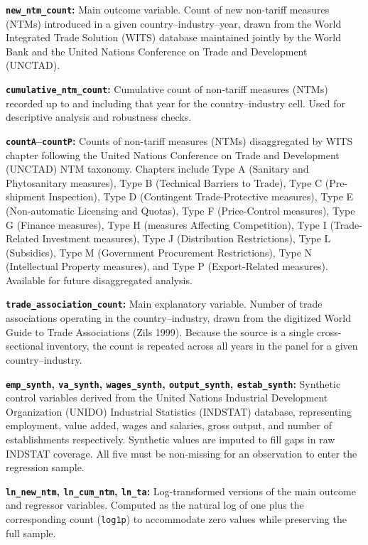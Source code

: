 \documentclass[12pt,letterpaper]{article}
\begin{document}
\noindent\textbf{\texttt{new\_ntm\_count}:}
Main outcome variable. Count of new non-tariff measures (NTMs) introduced in a given country--industry--year, drawn from the World Integrated Trade Solution (WITS) database maintained jointly by the World Bank and the United Nations Conference on Trade and Development (UNCTAD).

\noindent\textbf{\texttt{cumulative\_ntm\_count}:}
Cumulative count of non-tariff measures (NTMs) recorded up to and including that year for the country--industry cell. Used for descriptive analysis and robustness checks.

\noindent\textbf{\texttt{countA}--\texttt{countP}:}
Counts of non-tariff measures (NTMs) disaggregated by WITS chapter following the United Nations Conference on Trade and Development (UNCTAD) NTM taxonomy. Chapters include Type A (Sanitary and Phytosanitary measures), Type B (Technical Barriers to Trade), Type C (Pre-shipment Inspection), Type D (Contingent Trade-Protective measures), Type E (Non-automatic Licensing and Quotas), Type F (Price-Control measures), Type G (Finance measures), Type H (measures Affecting Competition), Type I (Trade-Related Investment measures), Type J (Distribution Restrictions), Type L (Subsidies), Type M (Government Procurement Restrictions), Type N (Intellectual Property measures), and Type P (Export-Related measures). Available for future disaggregated analysis.

\noindent\textbf{\texttt{trade\_association\_count}:}
Main explanatory variable. Number of trade associations operating in the country--industry, drawn from the digitized World Guide to Trade Associations (Zils 1999). Because the source is a single cross-sectional inventory, the count is repeated across all years in the panel for a given country--industry.

\noindent\textbf{\texttt{emp\_synth}, \texttt{va\_synth}, \texttt{wages\_synth}, \texttt{output\_synth}, \texttt{estab\_synth}:}
Synthetic control variables derived from the United Nations Industrial Development Organization (UNIDO) Industrial Statistics (INDSTAT) database, representing employment, value added, wages and salaries, gross output, and number of establishments respectively. Synthetic values are imputed to fill gaps in raw INDSTAT coverage. All five must be non-missing for an observation to enter the regression sample.

\noindent\textbf{\texttt{ln\_new\_ntm}, \texttt{ln\_cum\_ntm}, \texttt{ln\_ta}:}
Log-transformed versions of the main outcome and regressor variables. Computed as the natural log of one plus the corresponding count (\texttt{log1p}) to accommodate zero values while preserving the full sample.
\end{document}
